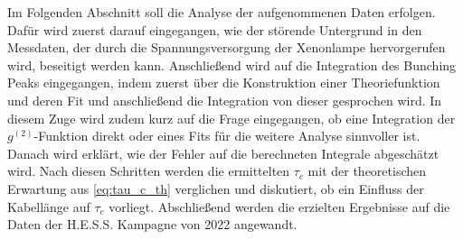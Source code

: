 Im Folgenden Abschnitt soll die Analyse der aufgenommenen Daten erfolgen. 
Dafür wird zuerst darauf eingegangen, wie der störende Untergrund in den Messdaten, der durch die Spannungsversorgung der Xenonlampe hervorgerufen wird, beseitigt werden kann. 
Anschließend wird auf die Integration des Bunching Peaks eingegangen, indem zuerst über die Konstruktion einer Theoriefunktion und deren Fit und anschließend die Integration von dieser gesprochen wird. 
In diesem Zuge wird zudem kurz auf die Frage eingegangen, ob eine Integration der $g^{(2)}$-Funktion direkt oder eines Fits für die weitere Analyse sinnvoller ist. 
Danach wird erklärt, wie der Fehler auf die berechneten Integrale abgeschätzt wird. 
Nach diesen Schritten werden die ermittelten $\tau_c$ mit der theoretischen Erwartung aus \autoref{eq:tau_c_th} verglichen und diskutiert, ob ein Einfluss der Kabellänge auf $\tau_c$ vorliegt. 
Abschließend werden die erzielten Ergebnisse auf die Daten der H.E.S.S. Kampagne von 2022 angewandt. 

